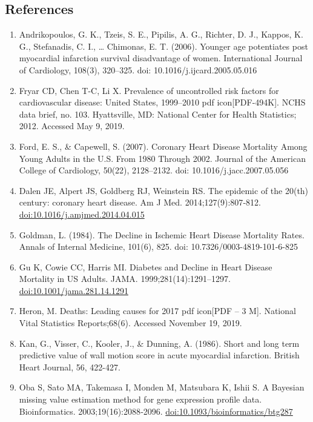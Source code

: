 \documentclass[
]{article}
\begin{document}
\hypertarget{references}{%
\subsection{References}\label{references}}

\begin{enumerate}
\def\labelenumi{\arabic{enumi}.}
\item
  Andrikopoulos, G. K., Tzeis, S. E., Pipilis, A. G., Richter, D. J.,
  Kappos, K. G., Stefanadis, C. I., \ldots{} Chimonas, E. T. (2006).
  Younger age potentiates post myocardial infarction survival
  disadvantage of women. International Journal of Cardiology, 108(3),
  320--325. doi: 10.1016/j.ijcard.2005.05.016
\item
  Fryar CD, Chen T-C, Li X. Prevalence of uncontrolled risk factors for
  cardiovascular disease: United States, 1999--2010 pdf
  icon{[}PDF-494K{]}. NCHS data brief, no. 103. Hyattsville, MD:
  National Center for Health Statistics; 2012. Accessed May 9, 2019.
\item
  Ford, E. S., \& Capewell, S. (2007). Coronary Heart Disease Mortality
  Among Young Adults in the U.S. From 1980 Through 2002. Journal of the
  American College of Cardiology, 50(22), 2128--2132. doi:
  10.1016/j.jacc.2007.05.056
\item
  Dalen JE, Alpert JS, Goldberg RJ, Weinstein RS. The epidemic of the
  20(th) century: coronary heart disease. Am J Med. 2014;127(9):807‐812.
  \url{doi:10.1016/j.amjmed.2014.04.015}
\item
  Goldman, L. (1984). The Decline in Ischemic Heart Disease Mortality
  Rates. Annals of Internal Medicine, 101(6), 825. doi:
  10.7326/0003-4819-101-6-825
\item
  Gu K, Cowie CC, Harris MI. Diabetes and Decline in Heart Disease
  Mortality in US Adults. JAMA. 1999;281(14):1291--1297.
  \url{doi:10.1001/jama.281.14.1291}
\item
  Heron, M. Deaths: Leading causes for 2017 pdf icon{[}PDF -- 3 M{]}.
  National Vital Statistics Reports;68(6). Accessed November 19, 2019.
\item
  Kan, G., Visser, C., Kooler, J., \& Dunning, A. (1986). Short and long
  term predictive value of wall motion score in acute myocardial
  infarction. British Heart Journal, 56, 422-427.
\item
  Oba S, Sato MA, Takemasa I, Monden M, Matsubara K, Ishii S. A Bayesian
  missing value estimation method for gene expression profile data.
  Bioinformatics. 2003;19(16):2088‐2096.
  \url{doi:10.1093/bioinformatics/btg287}

\end{enumerate}
\end{document}
